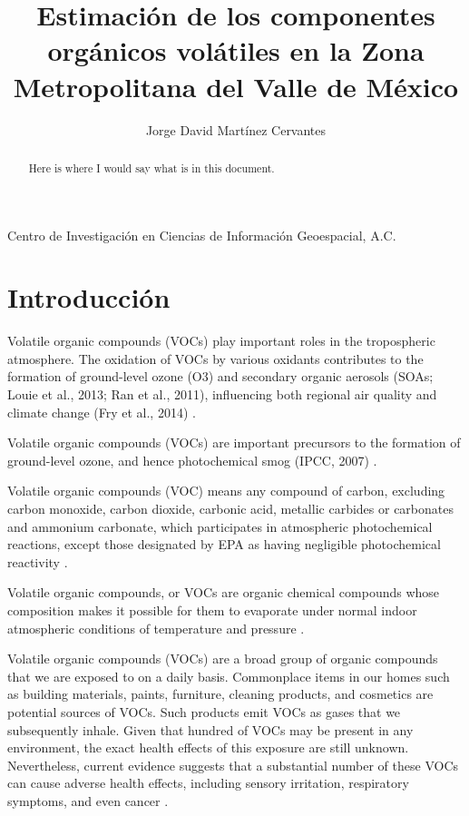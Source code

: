 \documentclass[10pt]{article}
\title{\renewcommand{\baselinestretch}{1.17}\bf%
Estimación de los componentes orgánicos volátiles en la Zona Metropolitana del Valle de México
}
\author{%
Jorge David Martínez Cervantes
}
\begin{document}
\maketitle

\begin{center}
    {\footnotesize 
    Centro de Investigación en Ciencias de Información Geoespacial, A.C. \\
    }
\end{center}
    
\begin{abstract}
	Here is where I would say what is in this document.
\end{abstract}

\vspace{-0.5cm}


\section{Introducción}\label{sec:introduccion}

Volatile organic compounds (VOCs) play important roles in the tropospheric atmosphere. The oxidation of VOCs by various oxidants contributes to the formation of ground-level ozone (O3) and secondary organic aerosols (SOAs; Louie et al., 2013; Ran et al., 2011), influencing both regional air quality and climate change (Fry et al., 2014) \cite{Wu2020}.

Volatile organic compounds (VOCs) are important precursors to the formation of ground-level ozone, and hence photochemical smog (IPCC, 2007) \cite{Louie2013}.

Volatile organic compounds (VOC) means any compound of carbon, excluding carbon monoxide, carbon dioxide, carbonic acid, metallic carbides or carbonates and ammonium carbonate, which participates in atmospheric photochemical reactions, except those designated by EPA as having negligible photochemical reactivity \cite{EPA2017}.

Volatile organic compounds, or VOCs are organic chemical compounds whose composition makes it possible for them to evaporate under normal indoor atmospheric conditions of temperature and pressure \cite{EPA2017}.

Volatile organic compounds (VOCs) are a broad group of organic compounds that we are exposed to on a daily basis. Commonplace items in our homes such as building materials, paints, furniture, cleaning products, and cosmetics are potential sources of VOCs. Such products emit VOCs as gases that we subsequently inhale. Given that hundred of VOCs may be present in any environment, the exact health effects of this exposure are still unknown. Nevertheless, current evidence suggests that a substantial number of these VOCs can cause adverse health effects, including sensory irritation, respiratory symptoms, and even cancer \cite{Rumchev2007}.
\end{document}
